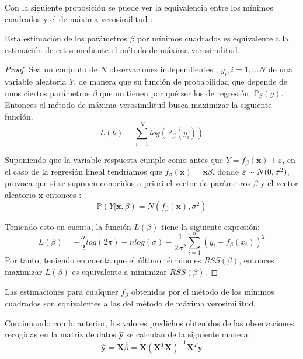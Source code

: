 \noindent Con la siguiente proposición se puede ver la equivalencia entre los mínimos cuadrados y el de máxima verosimilitud \cite{Hastie 2001}:

\begin{propo}
Esta estimación de los parámetros $\beta$ por mínimos cuadrados es equivalente a la estimación de estos mediante el método de máxima verosimilitud.
\begin{proof}
Sea un conjunto de $N$ observaciones independientes , $y_i, i=1,\ldots N$ de una variable aleatoria $Y$, de manera que su función de probabilidad que depende de unos ciertos parámetros $\beta$ que no tienen por qué ser los de regresión, $\mathbb{P}_\beta(y)$. Entonces el método de máxima verosimilitud busca maximizar la siguiente función.
\begin{equation}
L(\theta)=\sum_{i=1}^N log( \mathbb{P}_{\beta} (y_i))
\end{equation}

\noindent Suponiendo que la variable respuesta cumple como antes que  $Y=f_\beta (\textbf{x})+\varepsilon$, en el caso de la regresión lineal tendríamos que $f_\beta(\mathbf{x})=\mathbf{x}\beta$, donde $\varepsilon \thicksim N(0,\sigma^2)$, provoca que si se suponen conocidos a priori el vector de parámetros $\beta$ y el vector aleatorio $\textbf{x}$ entonces :
\begin{equation}
\mathbb{P}(Y|\textbf{x},\beta)=N(f_\beta(\textbf{x}), \sigma^2)
\end{equation}

\noindent Teniendo esto en cuenta, la función $L(\beta)$ tiene la siguiente expresión:
\begin{equation}
L(\beta)=-\dfrac{n}{2}log(2\pi)-n log(\sigma)-\dfrac{1}{2\sigma^2}\sum_{i=1}^n (y_i-f_\beta (x_i))^2
\end{equation}
Por tanto, teniendo en cuenta que el último término es $RSS(\beta)$, entonces maximizar $L(\beta)$ es equivalente a minimizar $RSS(\beta)$.
\end{proof}
\end{propo}
\begin{coro}
Las estimaciones para cualquier $f_{\beta}$ obtenidas por el método de los mínimos cuadrados son equivalentes a las del método de máxima verosimilitud.  
\end{coro}
\noindent Continuando con lo anterior, los valores predichos obtenidos de las observaciones recogidas en la matriz de datos $\hat{\textbf{y}}$ se calculan de la siguiente manera:
\begin{equation}
\hat{\textbf{y}}=\textbf{X}\hat{\beta}=\textbf{X}(\textbf{X}^T\textbf{X})^{-1}\textbf{X}^T\textbf{y}
\end{equation}

